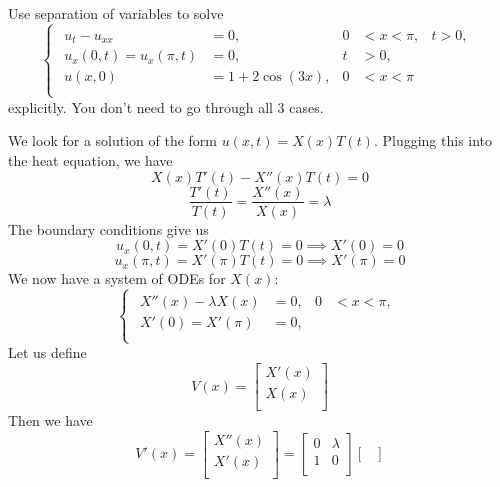 \documentclass[plain]{pset}
\begin{document}
\begin{problem}
Use separation of variables to solve
\[
    \begin{cases}
        \begin{aligned}
            u_t - u_{xx}            & = 0,             & 0 & < x < \pi, & t > 0, \\
            u_x(0, t) = u_x(\pi, t) & = 0,             & t & > 0,                \\
            u(x, 0)                 & = 1 + 2\cos(3x), & 0 & < x < \pi           \\
        \end{aligned}
    \end{cases}
\]
explicitly. You don't need to go through all 3 cases.
\end{problem}
\begin{solution}
    We look for a solution of the form \(u(x, t) = X(x)T(t)\). Plugging this into the heat equation, we have
    \[X(x)T'(t) - X''(x)T(t)  = 0\]
    \[\frac{T'(t)}{T(t)}      = \frac{X''(x)}{X(x)} = \lambda\]
    The boundary conditions give us
    \[u_x(0, t) = X'(0)T(t) = 0 \implies X'(0) = 0\]
    \[u_x(\pi, t) = X'(\pi)T(t) = 0 \implies X'(\pi) = 0\]
    We now have a system of ODEs for \(X(x)\):
    \[
        \begin{cases}
            \begin{aligned}
                X''(x) - \lambda X(x) & = 0, & 0 & < x < \pi, \\
                X'(0) = X'(\pi)       & = 0, &   &            \\
            \end{aligned}
        \end{cases}
    \]
    Let us define
    \[V(x) = \begin{bmatrix}
            X'(x) \\
            X(x)  \\
        \end{bmatrix}\]
    Then we have
    \[V'(x) = \begin{bmatrix}
            X''(x) \\
            X'(x)  \\
        \end{bmatrix} = \begin{bmatrix}
            0 & \lambda \\
            1 & 0       \\
        \end{bmatrix}\begin{bmatrix}

\end{bmatrix}\]
\end{solution}
\end{document}
